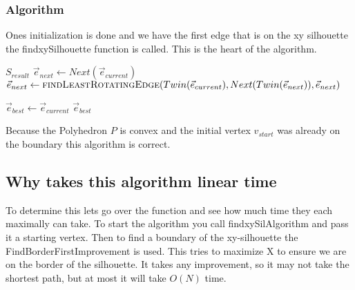 \documentclass{article}
\begin{document}
\subsubsection{Algorithm}
Ones initialization is done and we have the first edge that is on the xy
silhouette the findxySilhouette function is called.
This is the heart of the algorithm.
\begin{algorithmic}[1]
	\State
		\State \Return $S_{result}$
	\EndIf
	\State
	\State
	$\vec{e}_{next} \gets Next(\vec{e}_{current})$
	\State
	\State
	$\vec{e}_{next} \gets \Call{findLeastRotatingEdge}{Twin(\vec{e}_{current}), Next(Twin(\vec{e}_{next})), \vec{e}_{next}}$
	\State
	\Return {}
	\EndFunction

		\State
		$\vec{e}_{best} \gets \vec{e}_{current}$
	\EndIf
	\State
		\State
		\Return $\vec{e}_{best}$
	\EndIf
	\State
	\Return {}
	\EndFunction
\end{algorithmic}

Because the Polyhedron $P$ is convex  and
the initial vertex $v_{start}$ was already on the boundary this
algorithm is correct.

\subsection{Why takes this algorithm linear time}
To determine this lets go over the function and see how much time they each
maximally can take.
To start the algorithm you call findxySilAlgorithm and pass it a starting
vertex. Then to find a boundary of the xy-silhouette the
FindBorderFirstImprovement is used. This tries to maximize X to ensure we
are on the border of the silhouette. It takes any improvement, so it may
not take the shortest path, but at most it will take $O(N)$ time.
\end{document}
